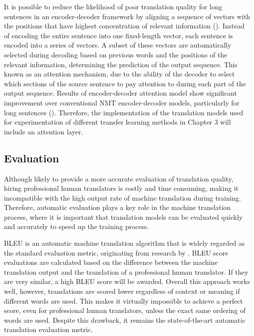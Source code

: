 It is possible to reduce the likelihood of poor translation quality for long sentences in an encoder-decoder framework by aligning a sequence of vectors with the positions that have highest concentration of relevant information (\cite{bahdanau_neural_2016}). 
Instead of encoding the entire sentence into one fixed-length vector, each sentence is encoded into a series of vectors. A subset of these vectors are automatically selected during decoding based on previous words and the positions of the relevant information, determining the prediction of the output sequence. This known as an attention mechanism, due to the ability of the decoder to select which sections of the source sentence to pay attention to during each part of the output sequence. Results of encoder-decoder attention model show significant improvement over conventional \acrshort{NMT} encoder-decoder models, particularly for long sentences (\cite{luong_effective_2015}). Therefore, the implementation of the translation models used for experimentation of different transfer learning methods in Chapter 3 will include an attention layer.

\subsection{Evaluation}

Although likely to provide a more accurate evaluation of translation quality, hiring professional human translators is costly and time consuming, making it incompatible with the high output rate of machine translation during training.
Therefore, automatic evaluation plays a key role in the machine translation process, where it is important that translation models can be evaluated quickly and accurately to speed up the training process.

\acrfull{BLEU} is an automatic machine translation algorithm that is widely regarded as the standard evaluation metric, originating from research by \cite{papineni_bleu_2001}. \acrshort{BLEU} score evaluations are calculated based on the difference between the machine translation output and the translation of a professional human translator. If they are very similar, a high \acrshort{BLEU} score will be awarded. Overall this approach works well, however, translations are scored lower regardless of context or meaning if different words are used. This makes it virtually impossible to achieve a perfect score, even for professional human translators, unless the exact same ordering of words are used. Despite this drawback, it remains the state-of-the-art automatic translation evaluation metric.

